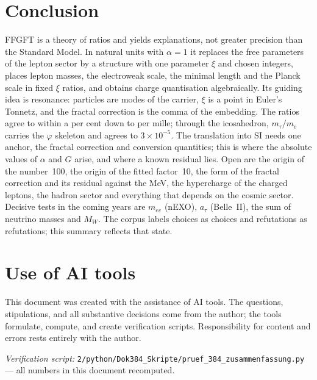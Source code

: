 \section{Conclusion}

\begin{ffkern}
FFGFT is a theory of ratios and yields explanations, not greater precision than the Standard
Model. In natural units with $\alpha=1$ it replaces the free parameters of
the lepton sector by a structure with one parameter $\xi$ and chosen integers, places lepton
masses, the electroweak scale, the minimal length and the Planck scale in fixed $\xi$ ratios, and
obtains charge quantisation algebraically. Its guiding idea is resonance: particles are modes of
the carrier, $\xi$ is a point in Euler's Tonnetz, and the fractal correction is the comma of the
embedding. The ratios agree to within a per cent down to per
mille; through the icosahedron, $m_\tau/m_e$ carries the $\varphi$ skeleton and agrees to
$3\times10^{-5}$. The translation into SI needs one anchor, the fractal correction and conversion quantities;
this is where the absolute values of $\alpha$ and $G$ arise, and where a known residual lies. Open
are the origin of the number~100, the origin of the fitted factor~10, the form of the fractal correction and its
residual against the MeV, the hypercharge of the charged leptons, the hadron sector and
everything that depends on the cosmic sector. Decisive tests in the coming years are $m_{ee}$
(nEXO), $a_\tau$ (Belle~II), the sum of neutrino masses and $M_W$. The corpus labels choices as
choices and refutations as refutations; this summary reflects that state.
\end{ffkern}

\section{Use of AI tools}

This document was created with the assistance of AI tools. The questions,
stipulations, and all substantive decisions come from the author; the tools
formulate, compute, and create verification scripts. Responsibility for content
and errors rests entirely with the author.

\vspace{1em}
\noindent\textit{Verification script:} \texttt{2/python/Dok384\_Skripte/pruef\_384\_zusammenfassung.py}
--- all numbers in this document recomputed.

